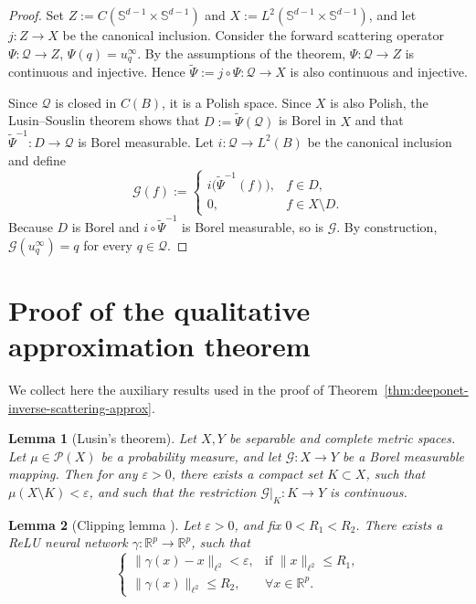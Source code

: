\documentclass{article}
\numberwithin{equation}{section}
\theoremstyle{plain}
\newtheorem{lemma}{Lemma}[section]
\begin{document}
	\begin{proof}
		Set $Z:=C(\mathbb{S}^{d-1}\times\mathbb{S}^{d-1})$ and $X:=L^2(\mathbb{S}^{d-1}\times\mathbb{S}^{d-1})$, and let $j:Z\to X$ be the canonical inclusion. Consider the forward scattering operator $\Psi:\mathcal Q\to Z$, $\Psi(q)=u_q^\infty$. By the assumptions of the theorem,
		$\Psi:\mathcal Q\to Z$ is continuous and injective. Hence
		$\widetilde\Psi:=j\circ\Psi:\mathcal Q\to X$ is also continuous and injective.
		
		Since $\mathcal Q$ is closed in $C(B)$, it is a Polish space. Since $X$ is also Polish, the Lusin--Souslin theorem shows that $D:=\widetilde\Psi(\mathcal Q)$ is Borel in $X$ and that $\widetilde\Psi^{-1}:D\to\mathcal Q$ is Borel measurable. Let $i:\mathcal Q\to L^2(B)$ be the canonical inclusion and define
		\[
			\mathscr{G}(f):=
			\begin{cases}
				i\bigl(\widetilde\Psi^{-1}(f)\bigr), & f\in D,\\
				0, & f\in X\setminus D.
			\end{cases}
		\]
		Because $D$ is Borel and $i\circ\widetilde\Psi^{-1}$ is Borel measurable, so is $\mathscr{G}$. By construction, $\mathscr{G}(u_q^\infty)=q$ for every $q\in\mathcal Q$.
	\end{proof}
	
	\section{Proof of the qualitative approximation theorem}
	\label{app:qualitative-approximation}
	We collect here the auxiliary results used in the proof of Theorem~\ref{thm:deeponet-inverse-scattering-approx}.
	\begin{lemma}[Lusin's theorem]
		Let $ X, Y $ be separable and complete metric spaces. Let $\mu \in \mathcal{P}(X)$ be a probability measure, and let $\mathscr{G} : X \to Y$ be a Borel measurable mapping. Then for any $\varepsilon > 0$, there exists a compact set $K \subset X$, such that $\mu(X \setminus K) < \varepsilon$, and such that the restriction $\mathscr{G}|_{K} : K \to Y$ is continuous.
	\end{lemma}
	
	\begin{lemma}[Clipping lemma \cite{LMK22}]
		Let $\varepsilon > 0$, and fix $0 < R_1 < R_2$. There exists a ReLU neural network $\gamma : \mathbb{R}^p \to \mathbb{R}^p$, such that
		\begin{equation*}
			\begin{cases}
				\|\gamma(x) - x\|_{\ell^2} < \varepsilon, & \text{if } \|x\|_{\ell^2} \leq R_1, \\
				\|\gamma(x)\|_{\ell^2} \leq R_2, & \forall x \in \mathbb{R}^p.
			\end{cases}
		\end{equation*}
	\end{lemma}
	
\end{document}

